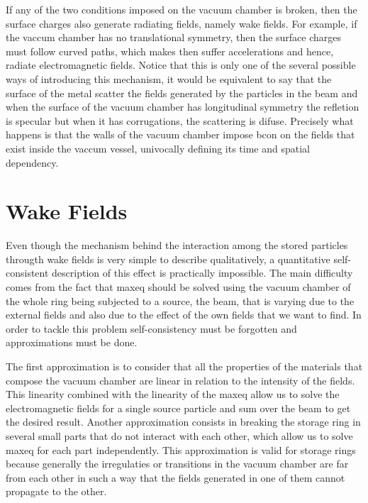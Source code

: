 \documentclass[
	12pt,				%
	openright,			%
	oneside,			%
	a4paper,		%
	chapter=TITLE,		%
	section=TITLE,		%
    brazil,				%
	english,			%
	sumario=tradicional,
	]{abntex2}
\begin{document}
  If any of the two conditions imposed on the vacuum chamber is broken, then the surface charges also generate radiating fields, namely wake fields. For example, if the vaccum chamber has no translational symmetry, then the surface charges must follow curved paths, which makes then suffer accelerations and hence, radiate electromagnetic fields. Notice that this is only one of the several possible ways of introducing this mechanism, it would be equivalent to say that the surface of the metal scatter the fields generated by the particles in the beam and when the surface of the vacuum chamber has longitudinal symmetry the refletion is specular but when it has corrugations, the scattering is difuse. Precisely what happens is that the walls of the vacuum chamber impose \gls{bcon} on the fields that exist inside the vaccum vessel, univocally defining its time and spatial dependency.


  \section{Wake Fields}\label{sec:wake_fields}

  Even though the mechanism behind the interaction among the stored particles througth wake fields is very simple to describe qualitatively, a quantitative self-consistent description of this effect is practically impossible. The main difficulty comes from the fact that \gls{maxeq} should be solved using the vacuum chamber of the whole ring being subjected to a source, the beam, that is varying due to the external fields and also due to the effect of the own fields that we want to find. In order to tackle this problem self-consistency must be forgotten and approximations must be done.

  The first approximation is to consider that all the properties of the materials that compose the vacuum chamber are linear in relation to the intensity of the fields. This linearity combined with the linearity of the \gls{maxeq} allow us to solve the electromagnetic fields for a single source particle and sum over the beam to get the desired result. Another approximation consists in breaking the storage ring in several small parts that do not interact with each other, which allow us to solve \gls{maxeq} for each part independently. This approximation is valid for storage rings because generally the irregulaties or transitions in the vacuum chamber are far from each other in such a way that the fields generated in one of them cannot propagate to the other.
\end{document}
